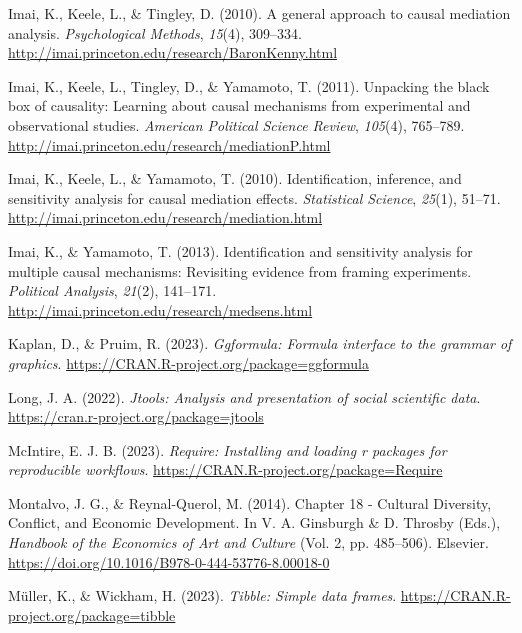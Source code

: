\documentclass[
  man,floatsintext]{apa7}
\newlength{\cslhangindent}
\newlength{\cslentryspacingunit} %
\newenvironment{CSLReferences}[2] %
 {%
  \setlength{\parindent}{0pt}
  \ifodd #1
  \let\oldpar\par
  \def\par{\hangindent=\cslhangindent\oldpar}
  \fi
  \setlength{\parskip}{#2\cslentryspacingunit}
 }%
 {}
\begin{document}
\begin{CSLReferences}{1}{0}
\leavevmode{}%
Imai, K., Keele, L., \& Tingley, D. (2010). A general approach to causal mediation analysis. \emph{Psychological Methods}, \emph{15}(4), 309--334. \url{http://imai.princeton.edu/research/BaronKenny.html}

\leavevmode{}%
Imai, K., Keele, L., Tingley, D., \& Yamamoto, T. (2011). Unpacking the black box of causality: Learning about causal mechanisms from experimental and observational studies. \emph{American Political Science Review}, \emph{105}(4), 765--789. \url{http://imai.princeton.edu/research/mediationP.html}

\leavevmode{}%
Imai, K., Keele, L., \& Yamamoto, T. (2010). Identification, inference, and sensitivity analysis for causal mediation effects. \emph{Statistical Science}, \emph{25}(1), 51--71. \url{http://imai.princeton.edu/research/mediation.html}

\leavevmode{}%
Imai, K., \& Yamamoto, T. (2013). Identification and sensitivity analysis for multiple causal mechanisms: Revisiting evidence from framing experiments. \emph{Political Analysis}, \emph{21}(2), 141--171. \url{http://imai.princeton.edu/research/medsens.html}

\leavevmode{}%
Kaplan, D., \& Pruim, R. (2023). \emph{Ggformula: Formula interface to the grammar of graphics}. \url{https://CRAN.R-project.org/package=ggformula}

\leavevmode{}%
Long, J. A. (2022). \emph{Jtools: Analysis and presentation of social scientific data}. \url{https://cran.r-project.org/package=jtools}

\leavevmode{}%
McIntire, E. J. B. (2023). \emph{Require: Installing and loading r packages for reproducible workflows}. \url{https://CRAN.R-project.org/package=Require}

\leavevmode{}%
Montalvo, J. G., \& Reynal-Querol, M. (2014). Chapter 18 - {Cultural Diversity}, {Conflict}, and {Economic Development}. In V. A. Ginsburgh \& D. Throsby (Eds.), \emph{Handbook of the {Economics} of {Art} and {Culture}} (Vol. 2, pp. 485--506). Elsevier. \url{https://doi.org/10.1016/B978-0-444-53776-8.00018-0}

\leavevmode{}%
Müller, K., \& Wickham, H. (2023). \emph{Tibble: Simple data frames}. \url{https://CRAN.R-project.org/package=tibble}


\end{CSLReferences}
\end{document}
